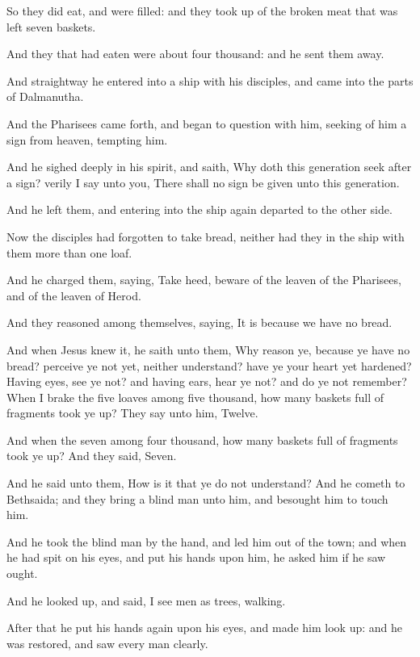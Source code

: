 \verse So they did eat, and were filled: and they took up of the broken meat that was left seven baskets.

\verse And they that had eaten were about four thousand: and he sent them away.

\verse And straightway he entered into a ship with his disciples, and came into the parts of Dalmanutha.

\verse And the Pharisees came forth, and began to question with him, seeking of him a sign from heaven, tempting him.

\verse And he sighed deeply in his spirit, and saith, Why doth this generation seek after a sign? verily I say unto you, There shall no sign be given unto this generation.

\verse And he left them, and entering into the ship again departed to the other side.

\verse Now the disciples had forgotten to take bread, neither had they in the ship with them more than one loaf.

\verse And he charged them, saying, Take heed, beware of the leaven of the Pharisees, and of the leaven of Herod.

\verse And they reasoned among themselves, saying, It is because we have no bread.

\verse And when Jesus knew it, he saith unto them, Why reason ye, because ye have no bread? perceive ye not yet, neither understand?  have ye your heart yet hardened?  \verse Having eyes, see ye not? and having ears, hear ye not? and do ye not remember?  \verse When I brake the five loaves among five thousand, how many baskets full of fragments took ye up? They say unto him, Twelve.

\verse And when the seven among four thousand, how many baskets full of fragments took ye up? And they said, Seven.

\verse And he said unto them, How is it that ye do not understand?  \verse And he cometh to Bethsaida; and they bring a blind man unto him, and besought him to touch him.

\verse And he took the blind man by the hand, and led him out of the town; and when he had spit on his eyes, and put his hands upon him, he asked him if he saw ought.

\verse And he looked up, and said, I see men as trees, walking.

\verse After that he put his hands again upon his eyes, and made him look up: and he was restored, and saw every man clearly.

